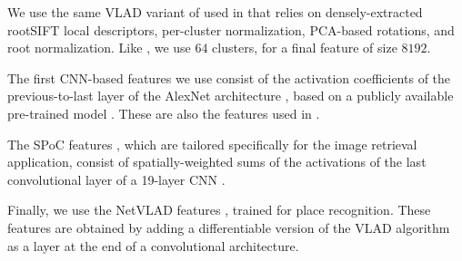 We use the same VLAD variant of \cite{Delhumeau2013} used in \cite{ZePe15} that relies on densely-extracted rootSIFT \cite{3things} local descriptors, per-cluster normalization, PCA-based rotations, and root normalization. Like \cite{ZePe15}, we use $64$ clusters, for a final feature of size $8192$.

The first CNN-based features we use consist of the activation coefficients of the previous-to-last layer of the AlexNet architecture \cite{Krizhevsky2012}, based on a publicly available pre-trained model \cite{jia2014caffe}. These are also the features used in \cite{ZePe15}.

The SPoC features \cite{babenko15}, which are tailored specifically for the image retrieval application, consist of spatially-weighted sums of the activations of the last convolutional layer of a 19-layer CNN \cite{SimonZisser15}.

Finally, we use the NetVLAD features \cite{Arandjelovic15}, trained for place recognition. These features are obtained by adding a differentiable version of the VLAD algorithm~\cite{Delhumeau2013} as a layer at the end of a convolutional architecture.



